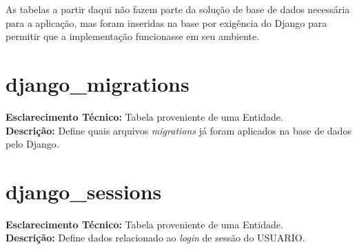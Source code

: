 \begin{apendicesenv}

\newpage

As tabelas a partir daqui não fazem parte da solução de base de dados necessária para a aplicação, mas foram inseridas na base por exigência do Django para permitir que a implementação funcionasse em seu ambiente.

\section*{django\_migrations}

\noindent\textbf{Esclarecimento Técnico:} Tabela proveniente de uma Entidade. \\
\textbf{Descrição:} Define quais arquivos \textit{migrations} já foram aplicados na base de dados pelo Django.

\begin{table}[h!]
\centering
\label{tab:django_migrations}
\end{table}

\section*{django\_sessions}

\noindent\textbf{Esclarecimento Técnico:} Tabela proveniente de uma Entidade. \\
\textbf{Descrição:} Define dados relacionado ao \textit{login} de sessão do USUARIO.


\end{apendicesenv}
